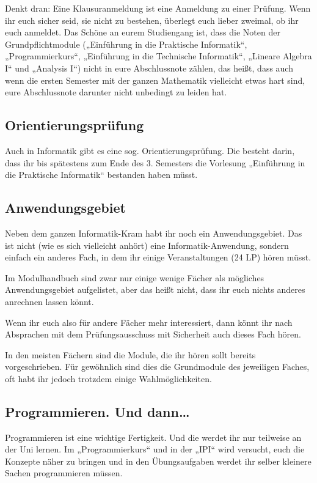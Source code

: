 Denkt dran: Eine Klausuranmeldung ist eine Anmeldung zu einer Prüfung. Wenn ihr
euch sicher seid, sie nicht zu bestehen, überlegt euch lieber zweimal, ob ihr
euch anmeldet. Das Schöne an eurem Studiengang ist, dass die Noten der
Grundpflichtmodule („Einführung in die Praktische Informatik“, „Programmierkurs“,
„Einführung in die Technische Informatik“, „Lineare Algebra I“ und „Analysis I“)
nicht in eure Abschlussnote zählen, das heißt, dass auch
wenn die ersten Semester mit der ganzen Mathematik vielleicht etwas hart sind,
eure Abschlussnote darunter nicht unbedingt zu leiden hat.


\subsection{Orientierungsprüfung}

Auch in Informatik gibt es eine sog. Orientierungsprüfung. Die besteht darin,
dass ihr bis spätestens zum Ende des 3. Semesters die Vorlesung
„Einführung in die Praktische Informatik“ bestanden haben müsst.


\subsection{Anwendungsgebiet}

Neben dem ganzen Informatik-Kram habt ihr noch ein Anwendungsgebiet.
Das ist nicht (wie es sich vielleicht anhört) eine Informatik-Anwendung,
sondern einfach ein anderes Fach, in dem ihr einige Veranstaltungen (24 \gls{LP}) hören müsst.

Im Modulhandbuch sind zwar nur einige wenige Fächer als mögliches Anwendungsgebiet aufgelistet,
aber das heißt nicht, dass ihr euch nichts anderes anrechnen lassen könnt.

Wenn ihr euch also für andere Fächer mehr interessiert, dann könnt ihr nach Absprachen mit dem Prüfungsausschuss mit Sicherheit auch dieses Fach hören.

In den meisten Fächern sind die Module, die ihr hören sollt bereits vorgeschrieben. Für gewöhnlich sind dies die Grundmodule des jeweiligen Faches, oft habt ihr jedoch trotzdem einige Wahlmöglichkeiten.


\subsection{Programmieren. Und dann\dots}

Programmieren ist eine wichtige Fertigkeit. Und die werdet ihr nur teilweise an
der Uni lernen. Im „Programmierkurs“ und in der „IPI“ wird versucht, euch die
Konzepte näher zu bringen und in den Übungsaufgaben werdet ihr selber kleinere
Sachen programmieren müssen.

